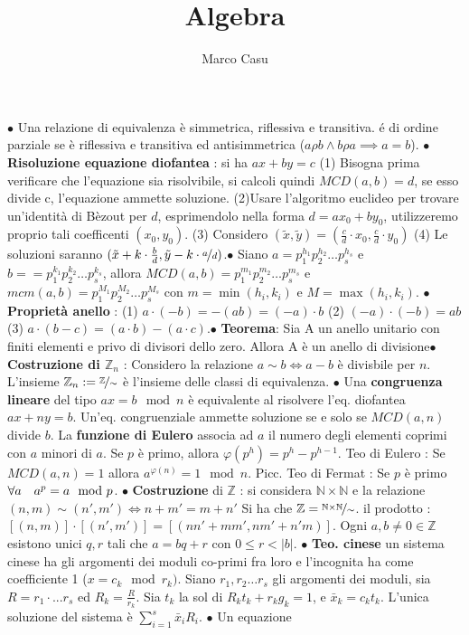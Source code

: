 \documentclass[1pt, letterpaper]{article}
\title{Algebra}
\author{Marco Casu}
\date{\vspace{-5ex}}
\newcommand{\Z}{{\mathbb Z}}
\newcommand{\N}{{\mathbb N}}
\newcommand{\spaz}{{\text{\hphantom{aa}}}}
\newcommand{\fdot}{{\(\bullet\) }}
\begin{document}
\newcommand{\omo}[1]{\(\varphi\)}

\fdot Una relazione di equivalenza è simmetrica, riflessiva e transitiva. é di ordine parziale se è  riflessiva e transitiva ed antisimmetrica (\(a\rho b\land b\rho a \implies a=b\)).
\fdot \textbf{Risoluzione equazione diofantea} : si ha \(ax + by = c\) (1)  Bisogna prima verificare che l’equazione sia risolvibile, si calcoli quindi
\(MCD(a, b) = d\), se esso divide c, l’equazione ammette soluzione. (2)Usare l’algoritmo euclideo per trovare un’identità di Bèzout per \(d\), esprimendolo
nella forma \(d = ax_0 + by_0\), utilizzeremo proprio tali coefficenti \((x_0, y_0)\). (3) Considero \((\tilde x,\tilde y)=(\frac{c}{d}\cdot x_0,\frac{c}{d}\cdot y_0)\) (4) Le soluzioni saranno 
\((\tilde x+k\cdot \frac{b}{d},\tilde y -k\cdot \nicefrac{a}{d} )\).\fdot Siano \(a=p_1^{h_1}p_2^{h_2}\dots p_s^{h_s}\) e \(b==p_1^{k_1}p_2^{k_2}\dots p_s^{k_s}\), allora 
\(MCD(a,b)=p_1^{m_1}p_2^{m_2}\dots p_s^{m_s}\) e \(mcm(a,b)=p_1^{M_1}p_2^{M_2}\dots p_s^{M_s}\) con \(m=\min(h_i,k_i)\) e \(M=\max(h_i,k_i)\). \fdot \textbf{Proprietà anello} : (1) \(a\cdot(-b)=-(ab)=(-a)\cdot b\)
(2) \((-a)\cdot (-b) = ab\) (3) \(a\cdot(b-c)=(a\cdot b)-(a\cdot c)\).\fdot \textbf{Teorema}: Sia A un anello unitario con finiti elementi e privo di divisori dello zero.
Allora A è un anello di divisione\fdot \textbf{Costruzione di \(\Z_n\)} : Considero la relazione \(a\sim b\iff a-b\) è divisbile per \(n\). L'insieme \(\Z_n:=\nicefrac{\Z}{\sim}\) 
è l'insieme delle classi di equivalenza. \fdot Una \textbf{congruenza lineare} del tipo \(ax=b\mod n\) è equivalente al risolvere l'eq. diofantea \(ax+ny=b\). Un'eq. congruenziale ammette soluzione se e solo 
se \(MCD(a,n)\) divide \(b\). La \textbf{funzione di Eulero} associa ad \(a\) il numero degli elementi coprimi con \(a\) minori di \(a\). Se \(p\) è primo, allora \(\varphi(p^h)=p^h-p^{h-1}\). Teo di Eulero : Se 
\(MCD(a,n)=1\) allora \(a^{\varphi(n)}=1\mod n\). Picc. Teo di Fermat : Se \(p\) è primo \(\forall a\spaz a^p=a\mod p\). \fdot \textbf{Costruzione} di \(\Z\) : si considera \(\N\times \N\) e la relazione 
\((n,m)\sim(n',m')\iff n+m'=m+n'\) Si ha che \(\Z=\nicefrac{\N\times \N}{\sim}\). il prodotto : \([(n,m)]\cdot[(n',m')]=[(nn'+mm',nm'+n'm)]\). Ogni \(a,b\ne0\in \Z \) esistono unici \(q,r\) tali che 
\(a=bq+r\) con \(0\le r<|b|\). \fdot \textbf{Teo. cinese} un sistema cinese  ha gli argomenti dei moduli co-primi fra loro e l'incognita ha come coefficiente 1 (\(x=c_k \mod r_k)\). Siano \(r_1,r_2\dots r_s\) gli argomenti dei moduli, 
sia \(R=r_1\cdot...r_s\) ed \(R_k=\frac{R}{r_k}\). Sia \(t_k\) la sol di \(R_kt_k+r_kg_k=1\), e \(\bar x_k=c_kt_k\). L'unica soluzione del sistema è \(\displaystyle\sum_{i=1}^s\bar x_iR_i\). \fdot Un equazione 
\end{document}
